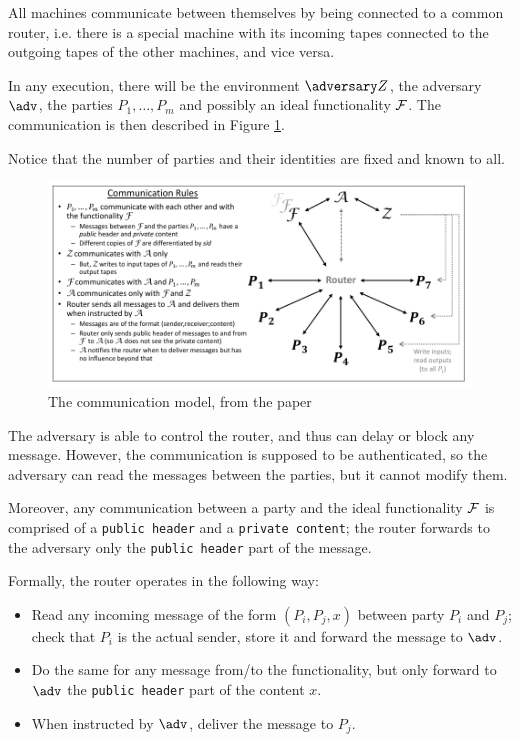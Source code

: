 All machines communicate between themselves by being connected to a common router, i.e. there is a special machine with its incoming tapes connected to the outgoing tapes of the other machines, and vice versa.

In any execution, there will be the environment $\zdv$, the adversary $\adv$, the parties $P_1,\dots,P_m$ and possibly an ideal functionality $\mathcal{F}$. The communication is then described in Figure \ref{SUC_router}.

Notice that the number of parties and their identities are fixed and known to all.

\begin{figure}
    \includegraphics[scale=0.9]{images/router}
    \caption{The communication model, from the \cite{Canetti_SUC} paper}
    \label{SUC_router}
\end{figure}

The adversary is able to control the router, and thus can delay or block any message. However, the communication is supposed to be authenticated, so the adversary can read the messages between the parties, but it cannot modify them.

Moreover, any communication between a party and the ideal functionality $\mathcal{F}$ is comprised of a \texttt{public header} and a \texttt{private content}; the router forwards to the adversary only the \texttt{public header} part of the message.

Formally, the router operates in the following way:
\begin{itemize}
    \item Read any incoming message of the form $(P_i,P_j,x)$ between party $P_i$ and $P_j$; check that $P_i$ is the actual sender, store it and forward the message to $\adv$.
    \item Do the same for any message from/to the functionality, but only forward to $\adv$ the \texttt{public header} part of the content $x$.
    \item When instructed by $\adv$, deliver the message to $P_j$.
\end{itemize}

